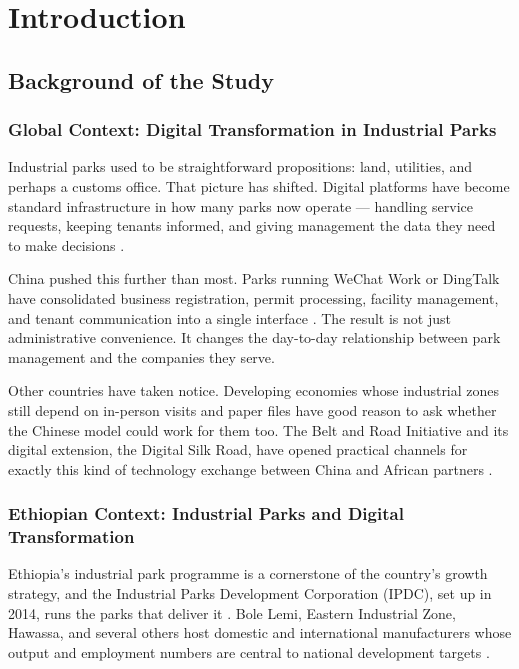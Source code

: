 \chapter{Introduction}
\label{ch:introduction}

\section{Background of the Study}

\subsection{Global Context: Digital Transformation in Industrial Parks}

Industrial parks used to be straightforward propositions: land, utilities, and perhaps a customs office. That picture has shifted. Digital platforms have become standard infrastructure in how many parks now operate --- handling service requests, keeping tenants informed, and giving management the data they need to make decisions \citep{Yang2025, Huang2023}.

China pushed this further than most. Parks running WeChat Work or DingTalk have consolidated business registration, permit processing, facility management, and tenant communication into a single interface \citep{Huang2023, Schreieck2022}. The result is not just administrative convenience. It changes the day-to-day relationship between park management and the companies they serve.

Other countries have taken notice. Developing economies whose industrial zones still depend on in-person visits and paper files have good reason to ask whether the Chinese model could work for them too. The Belt and Road Initiative and its digital extension, the Digital Silk Road, have opened practical channels for exactly this kind of technology exchange between China and African partners \citep{LiuBRI2023, deKluiver2024, ElKadi2024}.

\subsection{Ethiopian Context: Industrial Parks and Digital Transformation}

Ethiopia's industrial park programme is a cornerstone of the country's growth strategy, and the Industrial Parks Development Corporation (IPDC), set up in 2014, runs the parks that deliver it \citep{Oqubay2015, IPDC2020}. Bole Lemi, Eastern Industrial Zone, Hawassa, and several others host domestic and international manufacturers whose output and employment numbers are central to national development targets \citep{Guteta2024, Tesfaw2023}.

